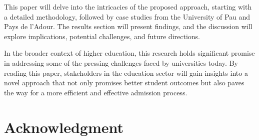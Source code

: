 \documentclass[conference]{IEEEtran}
\begin{document}
This paper will delve into the intricacies of the proposed approach, starting with a detailed methodology, followed by case studies from the University of Pau and Pays de l’Adour. The results section will present findings, and the discussion will explore implications, potential challenges, and future directions.

In the broader context of higher education, this research holds significant promise in addressing some of the pressing challenges faced by universities today. By reading this paper, stakeholders in the education sector will gain insights into a novel approach that not only promises better student outcomes but also paves the way for a more efficient and effective admission process.


\section*{Acknowledgment}
\vspace{12pt}


\end{document}
